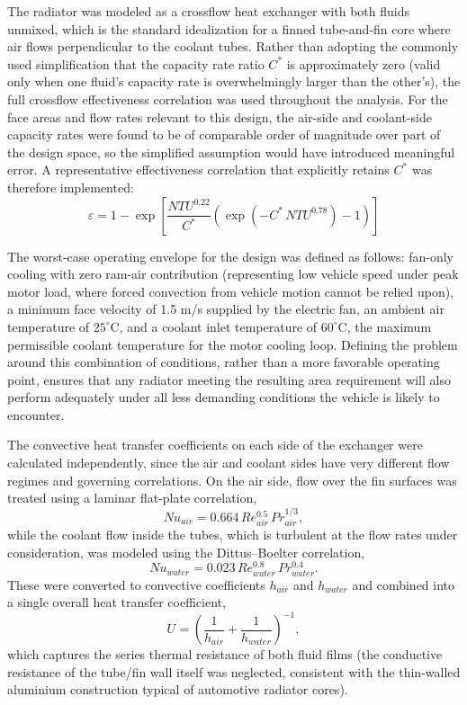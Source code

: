 \documentclass[12pt, a4paper]{article}
\begin{document}
The radiator was modeled as a crossflow heat exchanger with both fluids unmixed, which is the standard idealization for a finned tube-and-fin core where air flows perpendicular to the coolant tubes. Rather than adopting the commonly used simplification that the capacity rate ratio $C^*$ is approximately zero (valid only when one fluid's capacity rate is overwhelmingly larger than the other's), the full crossflow effectiveness correlation was used throughout the analysis. For the face areas and flow rates relevant to this design, the air-side and coolant-side capacity rates were found to be of comparable order of magnitude over part of the design space, so the simplified assumption would have introduced meaningful error. A representative effectiveness correlation that explicitly retains $C^*$ was therefore implemented:
\begin{equation}
    \varepsilon = 1 - \exp\left[\frac{NTU^{0.22}}{C^*}\left(\exp\left(-C^* \, NTU^{0.78}\right) - 1\right)\right]
\end{equation}

The worst-case operating envelope for the design was defined as follows: fan-only cooling with zero ram-air contribution (representing low vehicle speed under peak motor load, where forced convection from vehicle motion cannot be relied upon), a minimum face velocity of 1.5 m/s supplied by the electric fan, an ambient air temperature of $25^\circ$C, and a coolant inlet temperature of $60^\circ$C, the maximum permissible coolant temperature for the motor cooling loop. Defining the problem around this combination of conditions, rather than a more favorable operating point, ensures that any radiator meeting the resulting area requirement will also perform adequately under all less demanding conditions the vehicle is likely to encounter.

The convective heat transfer coefficients on each side of the exchanger were calculated independently, since the air and coolant sides have very different flow regimes and governing correlations. On the air side, flow over the fin surfaces was treated using a laminar flat-plate correlation,
\begin{equation}
    Nu_{air} = 0.664\,Re_{air}^{0.5}\,Pr_{air}^{1/3},
\end{equation}
while the coolant flow inside the tubes, which is turbulent at the flow rates under consideration, was modeled using the Dittus--Boelter correlation,
\begin{equation}
    Nu_{water} = 0.023\,Re_{water}^{0.8}\,Pr_{water}^{0.4}.
\end{equation}
These were converted to convective coefficients $h_{air}$ and $h_{water}$ and combined into a single overall heat transfer coefficient,
\begin{equation}
    U = \left(\frac{1}{h_{air}} + \frac{1}{h_{water}}\right)^{-1},
\end{equation}
which captures the series thermal resistance of both fluid films (the conductive resistance of the tube/fin wall itself was neglected, consistent with the thin-walled aluminium construction typical of automotive radiator cores).
\end{document}
